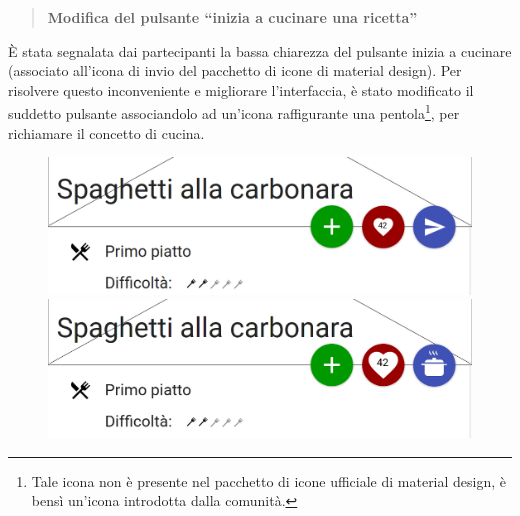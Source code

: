 \begin{quote}
	\textbf{Modifica del pulsante ``inizia a cucinare una ricetta''}
\end{quote}
È stata segnalata dai partecipanti la bassa chiarezza del pulsante inizia a
cucinare (associato all'icona di invio del pacchetto di icone di material
design).  Per risolvere questo inconveniente e migliorare l'interfaccia, è stato
modificato il suddetto pulsante associandolo ad un'icona raffigurante una
pentola\footnote{Tale icona non è presente nel pacchetto di icone ufficiale di
material design, è bensì un'icona introdotta dalla comunità.}, per richiamare il concetto di cucina.
\begin{figure}[H]
	\begin{minipage}{.49\textwidth}
		\includegraphics[width=\textwidth]{img/modifiche/presentazione_ricetta_old2.png}
	\end{minipage}
	\begin{minipage}{.49\textwidth}
		\includegraphics[width=\textwidth]{img/modifiche/presentazione_ricetta_new.png}
	\end{minipage}
\end{figure}

